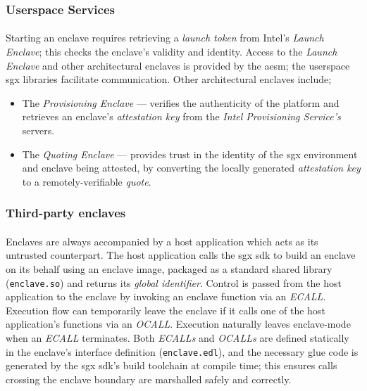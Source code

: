\subsubsection{Userspace Services}
\paragraph{} Starting an enclave requires retrieving a \textit{launch token} from Intel's \textit{Launch Enclave}; this checks the enclave's validity and identity. Access to the \textit{Launch Enclave} and other architectural enclaves is provided by the \acrfull{aesm}; the userspace \acrshort{sgx} libraries facilitate communication. Other architectural enclaves include;

\begin{itemize}
    \item The \textit{Provisioning Enclave} --- verifies the authenticity of the platform and retrieves an enclave's \textit{attestation key} from the \textit{Intel Provisioning Service's} servers.
    \item The \textit{Quoting Enclave} --- provides trust in the identity of the \acrshort{sgx} environment and enclave being attested, by converting the locally generated \textit{attestation key} to a remotely-verifiable \textit{quote}.
\end{itemize}

\subsubsection{Third-party enclaves}
\paragraph{} Enclaves are always accompanied by a host application which acts as its untrusted counterpart. The host application calls the \acrshort{sgx} \acrshort{sdk} to build an enclave on its behalf using an enclave image, packaged as a standard shared library (\texttt{enclave.so}) and returns its \textit{global identifier}. Control is passed from the host application to the enclave by invoking an enclave function via an \textit{ECALL}. Execution flow can temporarily leave the enclave if it calls one of the host application's functions via an \textit{OCALL}. Execution naturally leaves enclave-mode when an \textit{ECALL} terminates. Both \textit{ECALLs} and \textit{OCALLs} are defined statically in the enclave's interface definition (\texttt{enclave.edl}), and the necessary glue code is generated by the \acrshort{sgx} \acrshort{sdk}'s build toolchain at compile time; this ensures calls crossing the enclave boundary are marshalled safely and correctly.


